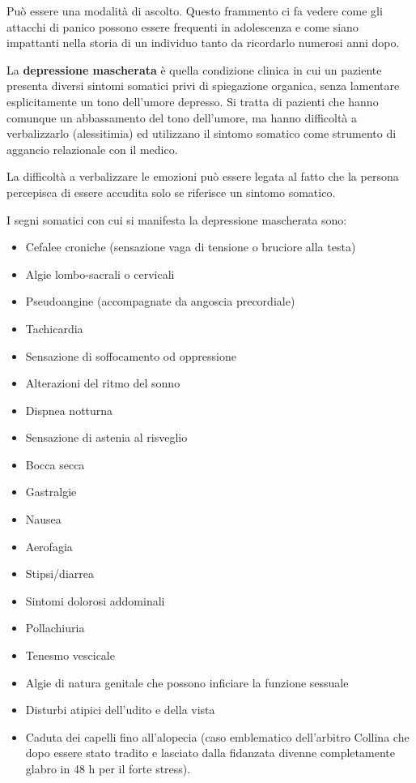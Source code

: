 Può essere una modalità di ascolto. Questo frammento ci fa vedere come
gli attacchi di panico possono essere frequenti in adolescenza e come
siano impattanti nella storia di un individuo tanto da ricordarlo
numerosi anni dopo.

La \textbf{depressione mascherata} è quella condizione clinica in cui un
paziente presenta diversi sintomi somatici privi di spiegazione
organica, senza lamentare esplicitamente un tono dell'umore depresso. Si
tratta di pazienti che hanno comunque un abbassamento del tono
dell'umore, ma hanno difficoltà a verbalizzarlo (alessitimia) ed
utilizzano il sintomo somatico come strumento di aggancio relazionale
con il medico.

La difficoltà a verbalizzare le emozioni può essere legata al fatto che
la persona percepisca di essere accudita solo se riferisce un sintomo
somatico.

I segni somatici con cui si manifesta la depressione mascherata sono:

\begin{itemize}
\item
  Cefalee croniche (sensazione vaga di tensione o bruciore alla testa)
\item
  Algie lombo-sacrali o cervicali
\item
  Pseudoangine (accompagnate da angoscia precordiale)
\item
  Tachicardia
\item
  Sensazione di soffocamento od oppressione
\item
  Alterazioni del ritmo del sonno
\item
  Dispnea notturna
\item
  Sensazione di astenia al risveglio
\item
  Bocca secca
\item
  Gastralgie
\item
  Nausea
\item
  Aerofagia
\item
  Stipsi/diarrea
\item
  Sintomi dolorosi addominali
\item
  Pollachiuria
\item
  Tenesmo vescicale
\item
  Algie di natura genitale che possono inficiare la funzione sessuale
\item
  Disturbi atipici dell'udito e della vista
\item
  Caduta dei capelli fino all'alopecia (caso emblematico dell'arbitro
  Collina che dopo essere stato tradito e lasciato dalla fidanzata
  divenne completamente glabro in 48 h per il forte stress).
\end{itemize}

